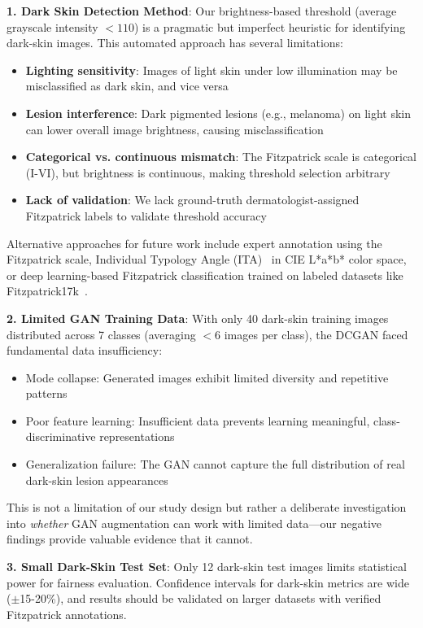 \documentclass[10pt, twocolumn, letterpaper]{article}
\begin{document}
\textbf{1. Dark Skin Detection Method}: Our brightness-based threshold (average grayscale intensity $< 110$) is a pragmatic but imperfect heuristic for identifying dark-skin images. This automated approach has several limitations:
\begin{itemize}[leftmargin=*, itemsep=2pt]
    \item \textbf{Lighting sensitivity}: Images of light skin under low illumination may be misclassified as dark skin, and vice versa
    \item \textbf{Lesion interference}: Dark pigmented lesions (e.g., melanoma) on light skin can lower overall image brightness, causing misclassification
    \item \textbf{Categorical vs. continuous mismatch}: The Fitzpatrick scale is categorical (I-VI), but brightness is continuous, making threshold selection arbitrary
    \item \textbf{Lack of validation}: We lack ground-truth dermatologist-assigned Fitzpatrick labels to validate threshold accuracy
\end{itemize}

Alternative approaches for future work include expert annotation using the Fitzpatrick scale, Individual Typology Angle (ITA)~\cite{chardon1991} in CIE L*a*b* color space, or deep learning-based Fitzpatrick classification trained on labeled datasets like Fitzpatrick17k~\cite{groh2021}.

\textbf{2. Limited GAN Training Data}: With only 40 dark-skin training images distributed across 7 classes (averaging $<$6 images per class), the DCGAN faced fundamental data insufficiency:
\begin{itemize}[leftmargin=*, itemsep=2pt]
    \item Mode collapse: Generated images exhibit limited diversity and repetitive patterns
    \item Poor feature learning: Insufficient data prevents learning meaningful, class-discriminative representations
    \item Generalization failure: The GAN cannot capture the full distribution of real dark-skin lesion appearances
\end{itemize}

This is not a limitation of our study design but rather a deliberate investigation into \textit{whether} GAN augmentation can work with limited data—our negative findings provide valuable evidence that it cannot.

\textbf{3. Small Dark-Skin Test Set}: Only 12 dark-skin test images limits statistical power for fairness evaluation. Confidence intervals for dark-skin metrics are wide ($\pm$15-20\%), and results should be validated on larger datasets with verified Fitzpatrick annotations.
\end{document}
